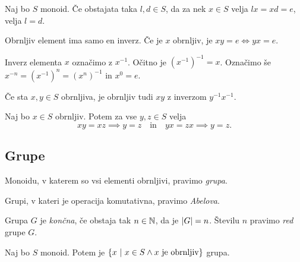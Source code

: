 \begin{trditev}
Naj bo $S$ monoid. Če obstajata taka $l,d\in S$, da za nek $x\in S$
velja $lx=xd=e$, velja $l=d$.
\end{trditev}

\obvs

\begin{posledica}
Obrnljiv element ima samo en inverz. Če je $x$ obrnljiv, je
$xy=e\iff yx=e$.
\end{posledica}

\begin{opomba}
Inverz elementa $x$ označimo z $x^{-1}$. Očitno je
$(x^{-1})^{-1}=x$. Označimo še $x^{-n}=(x^{-1})^n=(x^n)^{-1}$ in
$x^0=e$.
\end{opomba}

\begin{trditev}
Če sta $x,y\in S$ obrnljiva, je obrnljiv tudi $xy$ z inverzom
$y^{-1}x^{-1}$.
\end{trditev}

\obvs

\begin{trditev}
Naj bo $x\in S$ obrnljiv. Potem za vse $y,z\in S$ velja
\[
xy=xz\implies y=z\quad\text{in}\quad yx=zx\implies y=z.
\]
\end{trditev}

\obvs

\newpage

\subsection{Grupe}

\begin{definicija}
Monoidu, v katerem so vsi elementi obrnljivi, pravimo
\emph{grupa}.
\end{definicija}

\begin{definicija}
Grupi, v kateri je operacija komutativna, pravimo
\emph{Abelova}.
\end{definicija}

\begin{definicija}
Grupa $G$ je \emph{končna},
če obstaja tak $n\in\mathbb{N}$, da je $\left\lvert G\right\rvert=n$. Številu $n$ pravimo
\emph{red} grupe $G$.
\end{definicija}

\begin{trditev}
Naj bo $S$ monoid. Potem je
$\left\{x~\middle\vert~x\in S\land\text{$x$ je obrnljiv}\right\}$ grupa.
\end{trditev}

